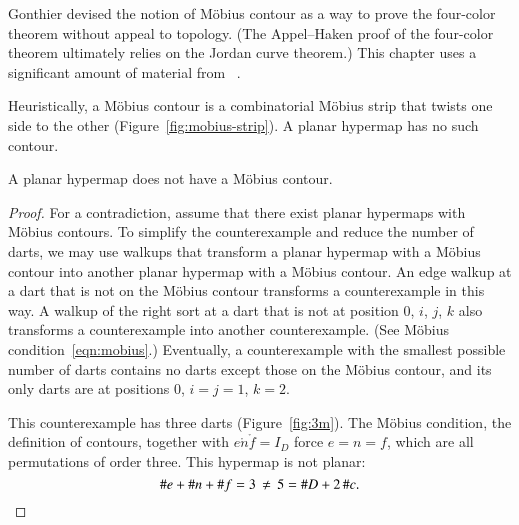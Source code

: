 \begin{remark}
Gonthier devised the notion of M\"obius contour as a way to prove
the four-color theorem without appeal to topology.  (The Appel--Haken
proof of the four-color theorem ultimately relies on the Jordan curve theorem.)
This chapter uses a significant amount of material from ~\cite{Gonthier:2005:FourColor}.
\end{remark}

\figMSWJHND %


\figIWKICBI %


\begin{remark}
 Heuristically, a M\"obius contour is a 
combinatorial M\"obius strip that
twists one side to the other (Figure~\ref{fig:mobius-strip}).  
A planar hypermap has no such contour.  
\end{remark}

\figOOXPORQ %


\begin{lemma}\label{lemma:no-mobius}
\hspace{-6pt}
A planar hypermap does not have a M\"obius contour.
\end{lemma}
%

\begin{proof} For a contradiction, assume that there exist planar
  hypermaps with M\"obius contours.  To simplify the counterexample
  and reduce the number of darts, we may use walkups that transform a
  planar hypermap with a M\"obius contour into another planar hypermap
  with a M\"obius contour.  An edge walkup at a dart that is not on
  the M\"obius contour transforms a counterexample in this way.  A
  walkup of the right sort at a dart that is not at position $0$, $i$,
  $j$, $k$ also transforms a counterexample into another counterexample.  (See
  M\"obius condition~\ref{eqn:mobius}.)
%
Eventually, a counterexample with
the smallest possible number of darts contains no
darts except those on the M\"obius contour, and its only darts
are at positions $0$, $i=j=1$, $k=2$.

This counterexample has three darts (Figure~\ref{fig:3m}).  
The M\"obius condition, the
definition of contours, together with $e\ocirc n\ocirc f=I_D$ force
$e=n=f$, which are all permutations of order three.  This hypermap is not planar:
\[
\# e + \# n + \# f = 3\,\ne\, 5 = \# D + 2\,
\#c.\qedhere
\]
\end{proof}



